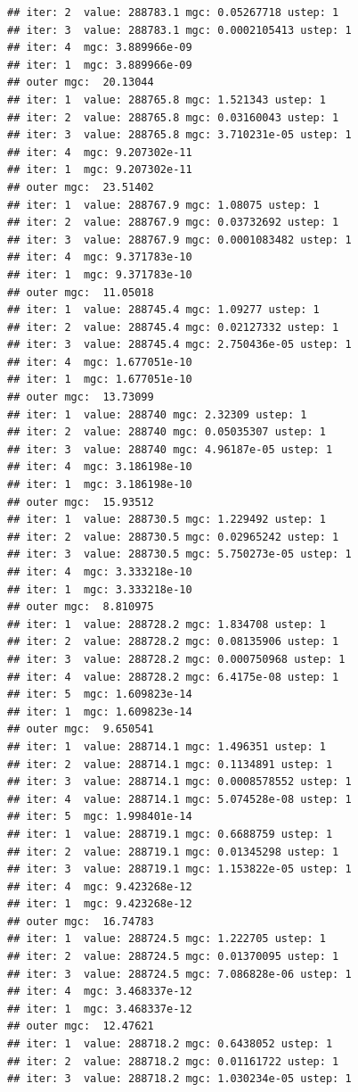 \documentclass{article}\usepackage[]{graphicx}\usepackage[]{xcolor}
\makeatletter
\newenvironment{kframe}{%
 \def\at@end@of@kframe{}%
 \ifinner\ifhmode%
  \def\at@end@of@kframe{\end{minipage}}%
  \begin{minipage}{\columnwidth}%
 \fi\fi%
 \def\FrameCommand##1{\hskip\@totalleftmargin \hskip-\fboxsep
 \colorbox{shadecolor}{##1}\hskip-\fboxsep
     \hskip-\linewidth \hskip-\@totalleftmargin \hskip\columnwidth}%
 \MakeFramed {\advance\hsize-\width
   \@totalleftmargin\z@ \linewidth\hsize
   \@setminipage}}%
 {\par\unskip\endMakeFramed%
 \at@end@of@kframe}
\newenvironment{knitrout}{}{} %
\makeatother
\begin{document}
\begin{knitrout}
\begin{kframe}
\begin{verbatim}
## iter: 2  value: 288783.1 mgc: 0.05267718 ustep: 1 
## iter: 3  value: 288783.1 mgc: 0.0002105413 ustep: 1 
## iter: 4  mgc: 3.889966e-09 
## iter: 1  mgc: 3.889966e-09 
## outer mgc:  20.13044 
## iter: 1  value: 288765.8 mgc: 1.521343 ustep: 1 
## iter: 2  value: 288765.8 mgc: 0.03160043 ustep: 1 
## iter: 3  value: 288765.8 mgc: 3.710231e-05 ustep: 1 
## iter: 4  mgc: 9.207302e-11 
## iter: 1  mgc: 9.207302e-11 
## outer mgc:  23.51402 
## iter: 1  value: 288767.9 mgc: 1.08075 ustep: 1 
## iter: 2  value: 288767.9 mgc: 0.03732692 ustep: 1 
## iter: 3  value: 288767.9 mgc: 0.0001083482 ustep: 1 
## iter: 4  mgc: 9.371783e-10 
## iter: 1  mgc: 9.371783e-10 
## outer mgc:  11.05018 
## iter: 1  value: 288745.4 mgc: 1.09277 ustep: 1 
## iter: 2  value: 288745.4 mgc: 0.02127332 ustep: 1 
## iter: 3  value: 288745.4 mgc: 2.750436e-05 ustep: 1 
## iter: 4  mgc: 1.677051e-10 
## iter: 1  mgc: 1.677051e-10 
## outer mgc:  13.73099 
## iter: 1  value: 288740 mgc: 2.32309 ustep: 1 
## iter: 2  value: 288740 mgc: 0.05035307 ustep: 1 
## iter: 3  value: 288740 mgc: 4.96187e-05 ustep: 1 
## iter: 4  mgc: 3.186198e-10 
## iter: 1  mgc: 3.186198e-10 
## outer mgc:  15.93512 
## iter: 1  value: 288730.5 mgc: 1.229492 ustep: 1 
## iter: 2  value: 288730.5 mgc: 0.02965242 ustep: 1 
## iter: 3  value: 288730.5 mgc: 5.750273e-05 ustep: 1 
## iter: 4  mgc: 3.333218e-10 
## iter: 1  mgc: 3.333218e-10 
## outer mgc:  8.810975 
## iter: 1  value: 288728.2 mgc: 1.834708 ustep: 1 
## iter: 2  value: 288728.2 mgc: 0.08135906 ustep: 1 
## iter: 3  value: 288728.2 mgc: 0.000750968 ustep: 1 
## iter: 4  value: 288728.2 mgc: 6.4175e-08 ustep: 1 
## iter: 5  mgc: 1.609823e-14 
## iter: 1  mgc: 1.609823e-14 
## outer mgc:  9.650541 
## iter: 1  value: 288714.1 mgc: 1.496351 ustep: 1 
## iter: 2  value: 288714.1 mgc: 0.1134891 ustep: 1 
## iter: 3  value: 288714.1 mgc: 0.0008578552 ustep: 1 
## iter: 4  value: 288714.1 mgc: 5.074528e-08 ustep: 1 
## iter: 5  mgc: 1.998401e-14 
## iter: 1  value: 288719.1 mgc: 0.6688759 ustep: 1 
## iter: 2  value: 288719.1 mgc: 0.01345298 ustep: 1 
## iter: 3  value: 288719.1 mgc: 1.153822e-05 ustep: 1 
## iter: 4  mgc: 9.423268e-12 
## iter: 1  mgc: 9.423268e-12 
## outer mgc:  16.74783 
## iter: 1  value: 288724.5 mgc: 1.222705 ustep: 1 
## iter: 2  value: 288724.5 mgc: 0.01370095 ustep: 1 
## iter: 3  value: 288724.5 mgc: 7.086828e-06 ustep: 1 
## iter: 4  mgc: 3.468337e-12 
## iter: 1  mgc: 3.468337e-12 
## outer mgc:  12.47621 
## iter: 1  value: 288718.2 mgc: 0.6438052 ustep: 1 
## iter: 2  value: 288718.2 mgc: 0.01161722 ustep: 1 
## iter: 3  value: 288718.2 mgc: 1.030234e-05 ustep: 1 

\end{verbatim}
\end{kframe}
\end{knitrout}
\end{document}
